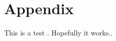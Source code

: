 \documentclass[../main.tex]{subfiles}
\begin{document}
                                                
\chapter{Appendix}                                 
This is a test \cite{shaw97}. Hopefully it works..              
\biblio                                                         
\end{document}
